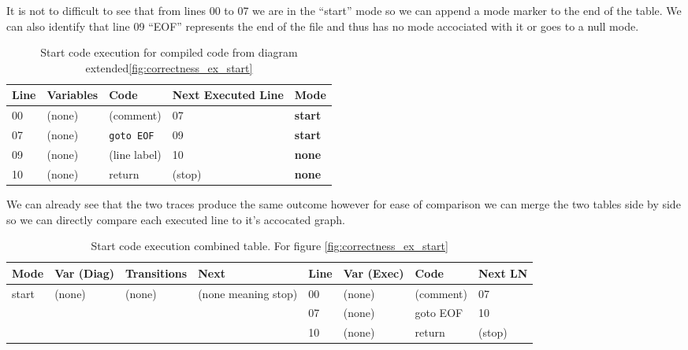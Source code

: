 It is not to difficult to see that from lines 00 to 07 we are in the ``start'' mode so we can append a
mode marker to the end of the table. We can also identify that line 09 ``EOF'' represents the end of the
file and thus has no mode accociated with it or goes to a null mode.

\begin{table}[htcb]
	\caption{Start code execution for compiled code from diagram extended\ref{fig:correctness_ex_start}}
	\centering
		\begin{tabular}{| l | l | l | l | l |}
			\hline
			\textbf{Line} & \textbf{Variables} & \textbf{Code} & \textbf{Next Executed Line} & \textbf{Mode}\\
			\hline
			00 & (none) & (comment) & 07 & \textbf{start} \\
			\hline
			07 & (none) & \texttt{goto EOF} & 09 &  \textbf{start}\\
			\hline
			09 & (none) & (line label) & 10 & \textbf{none} \\
			\hline
			10 & (none) & return & (stop) & \textbf{none} \\
			\hline
		\end{tabular}
	\label{table:BasicExecMode}
\end{table}

We can already see that the two traces produce the same outcome however for ease of comparison we can
merge the two tables side by side so we can directly compare each executed line to it's accocated graph.

\begin{table}[htcb]
	\caption{Start code execution combined table. For figure \ref{fig:correctness_ex_start}}
	\centering
	\tablefontsize
		\begin{tabular}{| p{} | p{} | p{} | p{} | p{} | p{} | p{} | p{} |}
			\hline
			\textbf{Mode} 		&	\textbf{Var (Diag)} 		& 	\textbf{Transitions} 		& 	\textbf{Next}		&	\textbf{Line}		&	\textbf{Var (Exec)	}	&	\textbf{Code}	&	\textbf{Next LN} \\
			\hline
			start 				&	(none)						&	(none)						&	(none meaning stop)	&	00					&	(none)					& 	(comment)		&	07 \\
			\hline
								&								&								&						&	07					& 	(none)					& 	goto EOF		& 	10 \\
			\hline
								&								&								&						&	10					&	(none)					&	return			&	(stop) \\
			\hline
		\end{tabular}
	\label{table:BasicExecCombined}
\end{table}

